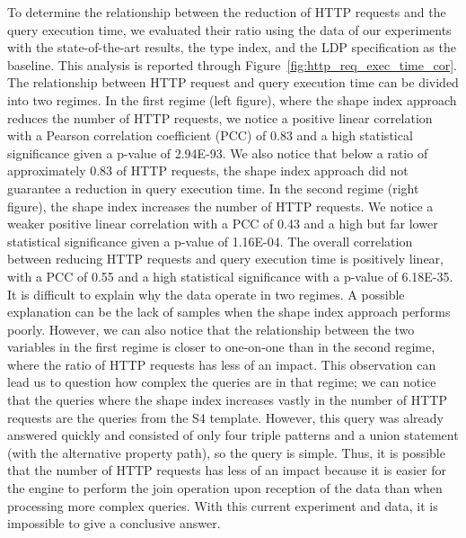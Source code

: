 To determine the relationship between the reduction of HTTP requests and the query execution time, we evaluated their ratio using 
the data of our experiments with the state-of-the-art results, the type index, and the LDP specification as the baseline.
This analysis is reported through Figure~\ref{fig:http_req_exec_time_cor}.
The relationship between HTTP request and query execution time can be divided into two regimes.
In the first regime (left figure), where the shape index approach reduces the number of HTTP requests, we notice a positive linear correlation with a
Pearson correlation coefficient (PCC) of 0.83 and a high statistical significance given a p-value of 2.94E-93.
We also notice that below a ratio of approximately 0.83 of HTTP requests, the shape index approach did not guarantee a reduction in query execution time.
In the second regime (right figure), the shape index increases the number of HTTP requests.
We notice a weaker positive linear correlation with a PCC of 0.43 and a high but far lower statistical significance given a p-value of 1.16E-04.
The overall correlation between reducing HTTP requests and query execution time is positively linear, with a PCC of 0.55 and a high statistical significance with a p-value of 6.18E-35.
It is difficult to explain why the data operate in two regimes. 
A possible explanation can be the lack of samples when the shape index approach performs poorly.
However, we can also notice that the relationship between the two variables in the first regime is closer to one-on-one than in the second regime, where the ratio of HTTP requests has less of an impact.
This observation can lead us to question how complex the queries are in that regime; we can notice that the queries where the shape index increases vastly in the number 
of HTTP requests are the queries from the S4 template. 
However, this query was already answered quickly and consisted of only four triple patterns and a union statement (with the alternative property path), so the query is simple. 
Thus, it is possible that the number of HTTP requests has less of an impact because it is easier for the engine to perform the join operation upon reception of the data than when processing more complex queries.
With this current experiment and data, it is impossible to give a conclusive answer.

